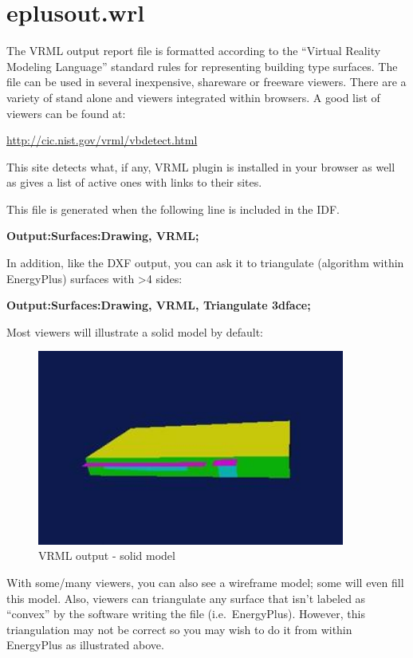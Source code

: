 \section{eplusout.wrl}\label{eplusout.wrl}

The VRML output report file is formatted according to the ``Virtual Reality Modeling Language'' standard rules for representing building type surfaces. The file can be used in several inexpensive, shareware or freeware viewers. There are a variety of stand alone and viewers integrated within browsers. A good list of viewers can be found at:

\url{http://cic.nist.gov/vrml/vbdetect.html}

This site detects what, if any, VRML plugin is installed in your browser as well as gives a list of active ones with links to their sites.

This file is generated when the following line is included in the IDF.

\textbf{Output:Surfaces:Drawing, VRML;}

In addition, like the DXF output, you can ask it to triangulate (algorithm within EnergyPlus) surfaces with \textgreater{}4 sides:

\textbf{Output:Surfaces:Drawing, VRML, Triangulate 3dface;}

Most viewers will illustrate a solid model by default:

\begin{figure}[hbtp] %
\centering
\includegraphics[width=0.9\textwidth, height=0.9\textheight, keepaspectratio=true]{media/image025.jpg}
\caption{VRML output - solid model \protect \label{fig:vrml-output-solid-model}}
\end{figure}

With some/many viewers, you can also see a wireframe model; some will even fill this model. Also, viewers can triangulate any surface that isn't labeled as ``convex'' by the software writing the file (i.e.~EnergyPlus). However, this triangulation may not be correct so you may wish to do it from within EnergyPlus as illustrated above.

